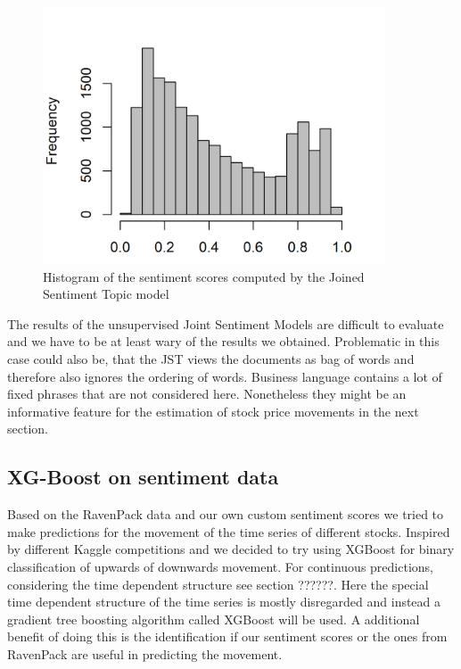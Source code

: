 \begin{figure}[h]
\centering
\includegraphics[width=4in]{figures/2SentimentsJST_Histogram.png}
\caption{Histogram of the sentiment scores computed by the Joined Sentiment Topic model}
\label{fig:JSTSentiment}
\end{figure}
The results of the unsupervised Joint Sentiment Models are difficult to evaluate and we have to be at least wary of the results we obtained. Problematic in this case could also be, that the JST views the documents as bag of words and therefore also ignores the ordering of words. Business language contains a lot of fixed phrases that are not considered here.  Nonetheless they might be an informative feature for the estimation of stock price movements in the next section. 


\subsection{XG-Boost on sentiment data}
Based on the RavenPack data and our own custom sentiment scores we tried to make predictions for the movement of the time series of different stocks. Inspired by different Kaggle competitions and \citep{li2018predicting} we decided to try using XGBoost for binary classification of upwards of downwards movement. For continuous predictions, considering the time dependent structure see section ??????. Here the special time dependent structure of the time series is mostly disregarded and instead a gradient tree boosting algorithm called XGBoost will be used. A additional benefit of doing this is the identification if our sentiment scores or the ones from RavenPack are useful in predicting the movement. \\

